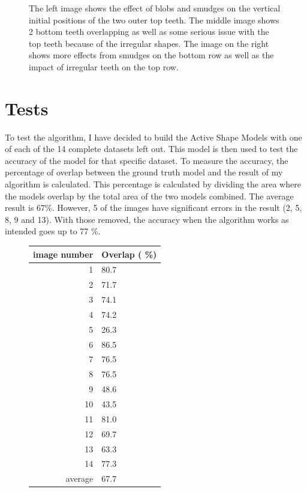 \documentclass[a4paper,10pt]{article}
\begin{document}
\begin{figure}[!h]
\begin{tabular}{ccc}
\end{tabular}
 \caption{The left image shows the effect of blobs and smudges on the vertical initial positions of the two outer top teeth. The middle image shows 2 bottom teeth overlapping as well as some serious issue with the top teeth because of the irregular shapes. The image on the right shows more effects from smudges on the bottom row as well as the impact of irregular teeth on the top row. }
\end{figure}

\section{Tests}
To test the algorithm, I have decided to build the Active Shape Models with one of each of the 14 complete datasets left out. This model is then used to test the accuracy of the model for that specific dataset. To measure the accuracy, the percentage of overlap between the ground truth model and the result of my algorithm is calculated. This percentage is calculated by dividing the area where the models overlap by the total area of the two models combined. The average result is 67\%. However, 5 of the images have significant errors in the result (2, 5, 8, 9 and 13). With those removed, the accuracy when the algorithm works as intended goes up to 77 \%.

\begin{figure}[!h]
\centering
\begin{tabular}{r|l}
image number & Overlap ( \%) \\
\hline
1 & 80.7	\\
2 & 71.7	\\
3 & 74.1	\\
4 & 74.2	\\
5 & 26.3	\\
6 & 86.5	\\
7 & 76.5	\\
8 & 76.5	\\
9 & 48.6	\\
10 & 43.5	\\
11 & 81.0	\\
12 & 69.7	\\
13 & 63.3	\\
14 & 77.3	\\
\hline
average & 67.7
\end{tabular}
\end{figure}
\end{document}
